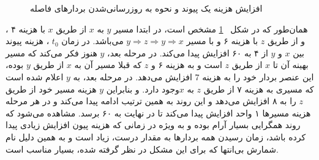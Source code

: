  \begin{figure}[H]
\centering
{}
\caption{افزایش هزینه یک پیوند و نحوه به روزرسانی‌شدن بردار‌های فاصله}
\label{fig:badnews}
\end{figure}
 
همان‌طور که در شکل 
~\ref{fig:badnews}
مشخص است، در ابتدا مسیر $y$ به $x$ از طریق $x$ با هزینه ۴ ، و از طریق $z$‌ با هزینه ۶ و با مسیر $y\Rightarrow z\Rightarrow y\Rightarrow x$   می‌باشد. در زمان $t_{0}$ ، هزینه پیوند بین $x$ و $y$ از ۴ به ۶۰ افزایش پیدا می‌کند. در مرحله بعد، $y$ هنوز فکر می‌کند که مسیر بهینه آن تا $x$ از طریق $z$ است و به هزینه ۶ و  $z$ که قبلا مسیر آن به $x$ از طریق $y$ بوده، این عنصر بردار خود را به هزینه $7$ افزایش می‌دهد. در مرحله بعد، به  $y$  اعلام شده است که مسیری به هزینه ۷ از طریق $z$ به  $x$وجود دارد. و بنابراین $y$ هزینه مسیر خود از طریق $z$ را به ۸ افزایش می‌دهد و این روند به همین ترتیب ادامه پیدا می‌کند و در هر مرحله هزینه مسیرها ۱ واحد افزایش پیدا می‌کند تا در نهایت به ۶۰ برسد. مشاهده می‌شود که روند همگرایی بسیار آرام بوده و به ویژه در زمانی که هزینه پیون افزایش زیادی پیدا کرده باشد، زمان رسیدن همه بردارها به مقدار درست، زیاد است و به همین دلیل نام شمارش بی‌انتها که برای این مشکل در نظر گرفته شده، بسیار مناسب است. 
